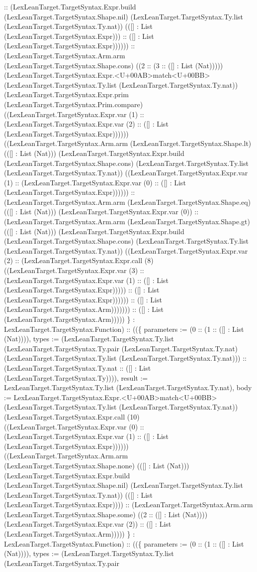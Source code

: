 \documentclass[11pt]{article}
\begin{document}
:: (LexLeanTarget.TargetSyntax.Expr.build (LexLeanTarget.TargetSyntax.Shape.nil) (LexLeanTarget.TargetSyntax.Ty.list (LexLeanTarget.TargetSyntax.Ty.nat)) (([] : List (LexLeanTarget.TargetSyntax.Expr))) :: ([] : List (LexLeanTarget.TargetSyntax.Expr)))))) :: (LexLeanTarget.TargetSyntax.Arm.arm (LexLeanTarget.TargetSyntax.Shape.cons) ((2 :: (3 :: ([] : List (Nat))))) (LexLeanTarget.TargetSyntax.Expr.<U+00AB>match<U+00BB> (LexLeanTarget.TargetSyntax.Ty.list (LexLeanTarget.TargetSyntax.Ty.nat)) (LexLeanTarget.TargetSyntax.Expr.prim (LexLeanTarget.TargetSyntax.Prim.compare) ((LexLeanTarget.TargetSyntax.Expr.var (1) :: (LexLeanTarget.TargetSyntax.Expr.var (2) :: ([] : List (LexLeanTarget.TargetSyntax.Expr)))))) ((LexLeanTarget.TargetSyntax.Arm.arm (LexLeanTarget.TargetSyntax.Shape.lt) (([] : List (Nat))) (LexLeanTarget.TargetSyntax.Expr.build (LexLeanTarget.TargetSyntax.Shape.cons) (LexLeanTarget.TargetSyntax.Ty.list (LexLeanTarget.TargetSyntax.Ty.nat)) ((LexLeanTarget.TargetSyntax.Expr.var (1) :: (LexLeanTarget.TargetSyntax.Expr.var (0) :: ([] : List (LexLeanTarget.TargetSyntax.Expr)))))) :: (LexLeanTarget.TargetSyntax.Arm.arm (LexLeanTarget.TargetSyntax.Shape.eq) (([] : List (Nat))) (LexLeanTarget.TargetSyntax.Expr.var (0)) :: (LexLeanTarget.TargetSyntax.Arm.arm (LexLeanTarget.TargetSyntax.Shape.gt) (([] : List (Nat))) (LexLeanTarget.TargetSyntax.Expr.build (LexLeanTarget.TargetSyntax.Shape.cons) (LexLeanTarget.TargetSyntax.Ty.list (LexLeanTarget.TargetSyntax.Ty.nat)) ((LexLeanTarget.TargetSyntax.Expr.var (2) :: (LexLeanTarget.TargetSyntax.Expr.call (8) ((LexLeanTarget.TargetSyntax.Expr.var (3) :: (LexLeanTarget.TargetSyntax.Expr.var (1) :: ([] : List (LexLeanTarget.TargetSyntax.Expr))))) :: ([] : List (LexLeanTarget.TargetSyntax.Expr)))))) :: ([] : List (LexLeanTarget.TargetSyntax.Arm))))))) :: ([] : List (LexLeanTarget.TargetSyntax.Arm))))) \} : LexLeanTarget.TargetSyntax.Function) :: ((\{ parameters := (0 :: (1 :: ([] : List (Nat)))), types := (LexLeanTarget.TargetSyntax.Ty.list (LexLeanTarget.TargetSyntax.Ty.pair (LexLeanTarget.TargetSyntax.Ty.nat) (LexLeanTarget.TargetSyntax.Ty.list (LexLeanTarget.TargetSyntax.Ty.nat))) :: (LexLeanTarget.TargetSyntax.Ty.nat :: ([] : List (LexLeanTarget.TargetSyntax.Ty)))), result := LexLeanTarget.TargetSyntax.Ty.list (LexLeanTarget.TargetSyntax.Ty.nat), body := LexLeanTarget.TargetSyntax.Expr.<U+00AB>match<U+00BB> (LexLeanTarget.TargetSyntax.Ty.list (LexLeanTarget.TargetSyntax.Ty.nat)) (LexLeanTarget.TargetSyntax.Expr.call (10) ((LexLeanTarget.TargetSyntax.Expr.var (0) :: (LexLeanTarget.TargetSyntax.Expr.var (1) :: ([] : List (LexLeanTarget.TargetSyntax.Expr)))))) ((LexLeanTarget.TargetSyntax.Arm.arm (LexLeanTarget.TargetSyntax.Shape.none) (([] : List (Nat))) (LexLeanTarget.TargetSyntax.Expr.build (LexLeanTarget.TargetSyntax.Shape.nil) (LexLeanTarget.TargetSyntax.Ty.list (LexLeanTarget.TargetSyntax.Ty.nat)) (([] : List (LexLeanTarget.TargetSyntax.Expr)))) :: (LexLeanTarget.TargetSyntax.Arm.arm (LexLeanTarget.TargetSyntax.Shape.some) ((2 :: ([] : List (Nat)))) (LexLeanTarget.TargetSyntax.Expr.var (2)) :: ([] : List (LexLeanTarget.TargetSyntax.Arm))))) \} : LexLeanTarget.TargetSyntax.Function) :: ((\{ parameters := (0 :: (1 :: ([] : List (Nat)))), types := (LexLeanTarget.TargetSyntax.Ty.list (LexLeanTarget.TargetSyntax.Ty.pair 
\end{document}
